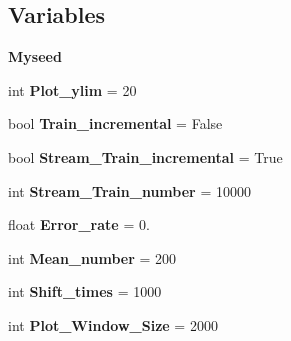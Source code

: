 \subsection*{Variables}
\begin{DoxyCompactItemize}
\item 
{\bfseries Myseed}\hypertarget{namespaceSAD_1_1Main_a0625a68680fe476e3a38c55669ec49ca}{}\label{namespaceSAD_1_1Main_a0625a68680fe476e3a38c55669ec49ca}

\item 
int {\bfseries Plot\+\_\+ylim} = 20\hypertarget{namespaceSAD_1_1Main_a194be1cda3175225c22109dba23a4142}{}\label{namespaceSAD_1_1Main_a194be1cda3175225c22109dba23a4142}

\item 
bool {\bfseries Train\+\_\+incremental} = False\hypertarget{namespaceSAD_1_1Main_a98ae0dd0686308bdb555c8867a9c347d}{}\label{namespaceSAD_1_1Main_a98ae0dd0686308bdb555c8867a9c347d}

\item 
bool {\bfseries Stream\+\_\+\+Train\+\_\+incremental} = True\hypertarget{namespaceSAD_1_1Main_a335e93ce2f9a4ade5ee88c597af6c7a9}{}\label{namespaceSAD_1_1Main_a335e93ce2f9a4ade5ee88c597af6c7a9}

\item 
int {\bfseries Stream\+\_\+\+Train\+\_\+number} = 10000\hypertarget{namespaceSAD_1_1Main_ab1a2a4c51008325c8d35a1c46d03b99a}{}\label{namespaceSAD_1_1Main_ab1a2a4c51008325c8d35a1c46d03b99a}

\item 
float {\bfseries Error\+\_\+rate} = 0.\hypertarget{namespaceSAD_1_1Main_a5456dbfce839159d79b2e884585405d2}{}\label{namespaceSAD_1_1Main_a5456dbfce839159d79b2e884585405d2}

\item 
int {\bfseries Mean\+\_\+number} = 200\hypertarget{namespaceSAD_1_1Main_a4c838db683ce398fe9d7f1604777b151}{}\label{namespaceSAD_1_1Main_a4c838db683ce398fe9d7f1604777b151}

\item 
int {\bfseries Shift\+\_\+times} = 1000\hypertarget{namespaceSAD_1_1Main_a68b81e7deb40bea4e231a42e94ae84da}{}\label{namespaceSAD_1_1Main_a68b81e7deb40bea4e231a42e94ae84da}

\item 
int {\bfseries Plot\+\_\+\+Window\+\_\+\+Size} = 2000\hypertarget{namespaceSAD_1_1Main_ace720900143a1070b2e4c9e274ca116d}{}\label{namespaceSAD_1_1Main_ace720900143a1070b2e4c9e274ca116d}


\end{DoxyCompactItemize}
